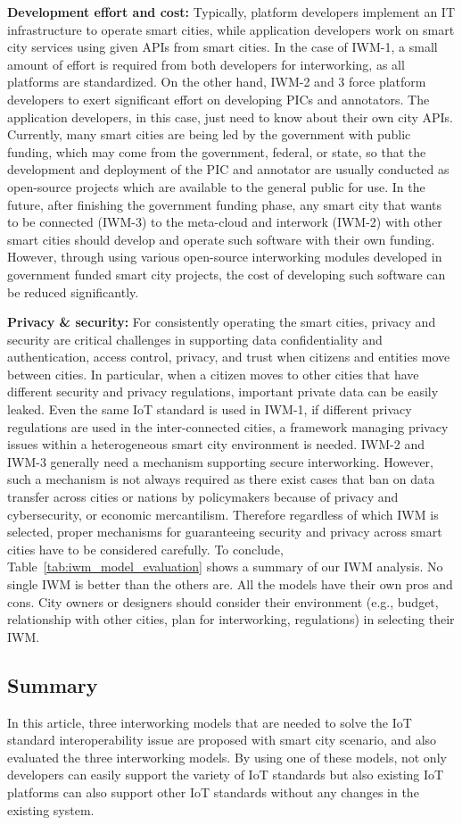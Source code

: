 \textbf{Development effort and cost:} Typically, platform developers implement an IT infrastructure to operate smart cities, while application developers work on smart city services using given APIs from smart cities. In the case of IWM-1, a small amount of effort is required from both developers for interworking, as all platforms are standardized. On the other hand, IWM-2 and 3 force platform developers to exert significant effort on developing PICs and annotators. The application developers, in this case, just need to know about their own city APIs. Currently, many smart cities are being led by the government with public funding, which may come from the government, federal, or state, so that the development and deployment of the PIC and annotator are usually conducted as open-source projects which are available to the general public for use. In the future, after finishing the government funding phase, any smart city that wants to be connected (IWM-3) to the meta-cloud and interwork (IWM-2) with other smart cities should develop and operate such software with their own funding. However, through using various open-source interworking modules developed in government funded smart city projects, the cost of developing such software can be reduced significantly.

\textbf{Privacy \& security:} For consistently operating the smart cities, privacy and security are critical challenges in supporting data confidentiality and authentication, access control, privacy, and trust when citizens and entities move between cities. In particular, when a citizen moves to other cities that have different security and privacy regulations, important private data can be easily leaked. Even the same IoT standard is used in IWM-1, if different privacy regulations are used in the inter-connected cities, a framework managing privacy issues within a heterogeneous smart city environment is needed. IWM-2 and IWM-3 generally need a mechanism supporting secure interworking. However, such a mechanism is not always required as there exist cases that ban on data transfer across cities or nations by policymakers because of privacy and cybersecurity, or economic mercantilism. Therefore regardless of which IWM is selected, proper mechanisms for guaranteeing security and privacy across smart cities have to be considered carefully. To conclude, Table~\ref{tab:iwm_model_evaluation} shows a summary of our IWM analysis. No single IWM is better than the others are. All the models have their own pros and cons. City owners or designers should consider their environment (e.g., budget, relationship with other cities, plan for interworking, regulations) in selecting their IWM.

\subsection{Summary}
In this article, three interworking models that are needed to solve the IoT standard interoperability issue are proposed with smart city scenario, and also evaluated the three interworking models. By using one of these models, not only developers can easily support the variety of IoT standards but also existing IoT platforms can also support other IoT standards without any changes in the existing system.
\clearpage